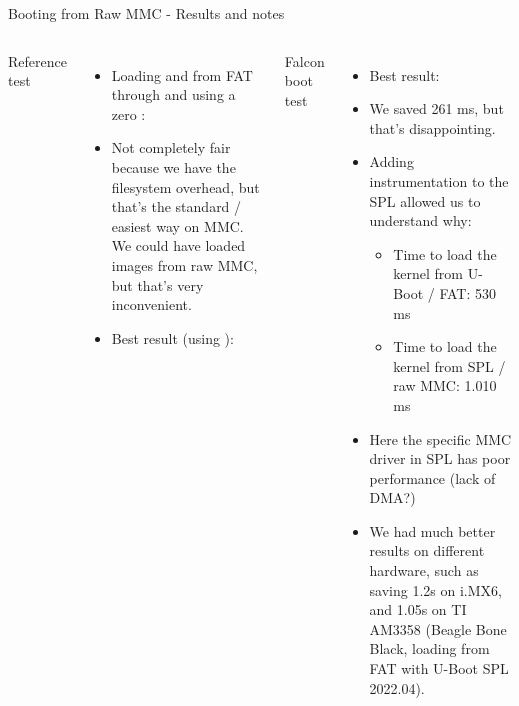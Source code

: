 \begin{frame}{Booting from Raw MMC - Results and notes}
  \scriptsize
  \begin{columns}
         Reference test
	\begin{itemize}
           \item Loading  and  from FAT through
                  and using a zero :\\
	   \item Not completely fair because we have the filesystem overhead, but that's the standard / easiest way on MMC.
		 We could have loaded images from raw MMC, but that's very inconvenient.
	   \item Best result (using ):\\
	\end{itemize}
        Falcon boot test
	\begin{itemize}
	   \item Best result:\\
	   \item We saved 261 ms, but that's disappointing.
	   \item Adding instrumentation to the SPL allowed us to understand why:
	   \begin{itemize}
	      \scriptsize
	      \item Time to load the kernel from U-Boot / FAT: 530 ms
	      \item Time to load the kernel from SPL / raw MMC: 1.010 ms
	   \end{itemize}
	   \item Here the specific MMC driver in SPL has poor performance (lack
		 of DMA?)
           \item We had much better results on different hardware, such
	         as saving 1.2s on i.MX6, and 1.05s on TI AM3358
                 (Beagle Bone Black, loading from FAT with U-Boot SPL
                 2022.04).
	\end{itemize}
  \end{columns}
\end{frame}

